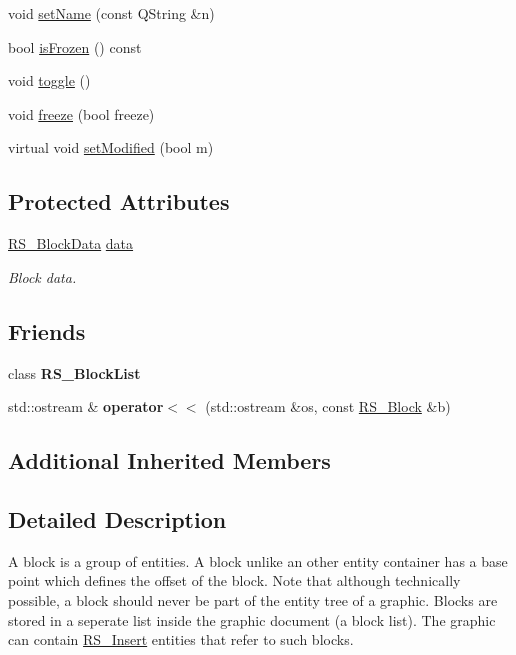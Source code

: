 \begin{DoxyCompactItemize}
\item 
void \hyperlink{classRS__Block_a0138315e50fbc584be61295c23804b4d}{set\-Name} (const Q\-String \&n)
\item 
bool \hyperlink{classRS__Block_ac43440d111abe6c1cc9ddae9b0f5727d}{is\-Frozen} () const 
\item 
void \hyperlink{classRS__Block_ad79ccca26afa6e02dea92bcd165eb360}{toggle} ()
\item 
void \hyperlink{classRS__Block_af5ef165dda427fe7b87aa4bb0e125bcf}{freeze} (bool freeze)
\item 
virtual void \hyperlink{classRS__Block_a7f5958a0728ee32ad361cbb79c4cc3f1}{set\-Modified} (bool m)
\end{DoxyCompactItemize}
\subsection*{Protected Attributes}
\begin{DoxyCompactItemize}
\item 
\hyperlink{classRS__BlockData}{R\-S\-\_\-\-Block\-Data} \hyperlink{classRS__Block_ae9303e76ea74cbf42f95ba9a1e476b1b}{data}
\begin{DoxyCompactList}\small\item\em Block data. \end{DoxyCompactList}\end{DoxyCompactItemize}
\subsection*{Friends}
\begin{DoxyCompactItemize}
\item 
\hypertarget{classRS__Block_af76093eaee24d0094ffbb739efcff4e1}{class {\bfseries R\-S\-\_\-\-Block\-List}}\label{classRS__Block_af76093eaee24d0094ffbb739efcff4e1}

\item 
\hypertarget{classRS__Block_a929f76719c4bd8106f359c10c45fb9fe}{std\-::ostream \& {\bfseries operator$<$$<$} (std\-::ostream \&os, const \hyperlink{classRS__Block}{R\-S\-\_\-\-Block} \&b)}\label{classRS__Block_a929f76719c4bd8106f359c10c45fb9fe}

\end{DoxyCompactItemize}
\subsection*{Additional Inherited Members}


\subsection{Detailed Description}
A block is a group of entities. A block unlike an other entity container has a base point which defines the offset of the block. Note that although technically possible, a block should never be part of the entity tree of a graphic. Blocks are stored in a seperate list inside the graphic document (a block list). The graphic can contain \hyperlink{classRS__Insert}{R\-S\-\_\-\-Insert} entities that refer to such blocks.

